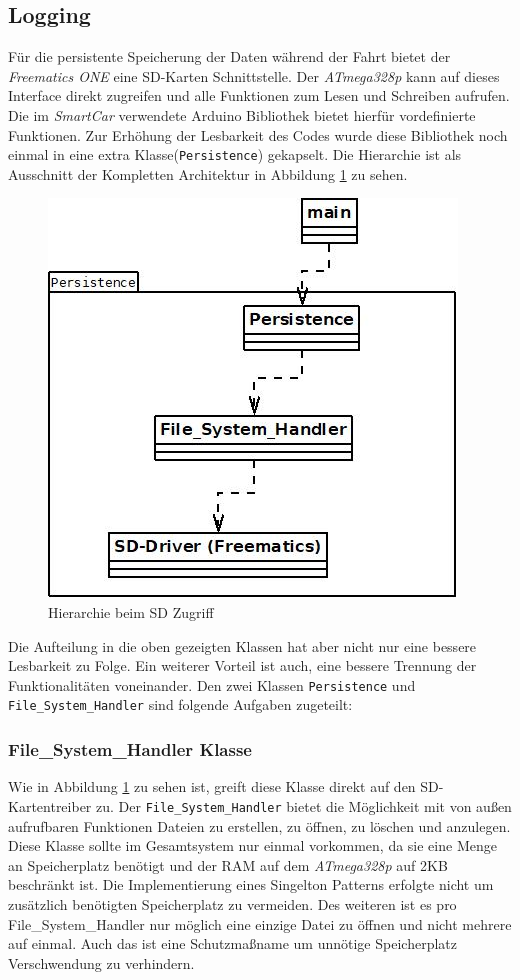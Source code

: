 \subsection{Logging}
\label{sec:Logging}
Für die persistente Speicherung der Daten während der Fahrt bietet der \textit{Freematics ONE} eine SD-Karten Schnittstelle. Der \textit{ATmega328p} kann auf dieses Interface direkt zugreifen und alle Funktionen zum Lesen und Schreiben aufrufen. Die im \textit{SmartCar} verwendete Arduino Bibliothek bietet hierfür vordefinierte Funktionen. Zur Erhöhung der Lesbarkeit des Codes wurde diese Bibliothek noch einmal in eine extra Klasse(\texttt{Persistence}) gekapselt. Die Hierarchie ist als Ausschnitt der Kompletten Architektur in Abbildung \ref{fig:Persistence} zu sehen. 
\begin{figure}[h]
  \begin{center}
    \includegraphics[scale=0.75]{./img/Persistence.jpg}
    \caption{Hierarchie beim SD Zugriff}
    \label{fig:Persistence}
  \end{center}
\end{figure}
Die Aufteilung in die oben gezeigten Klassen hat aber nicht nur eine bessere Lesbarkeit zu Folge. Ein weiterer Vorteil ist auch, eine bessere Trennung der Funktionalitäten voneinander. Den zwei Klassen \texttt{Persistence} und \texttt{File\_System\_Handler} sind folgende Aufgaben zugeteilt:\pagebreak
\subsubsection*{File\_System\_Handler Klasse}
Wie in Abbildung \ref{fig:Persistence} zu sehen ist, greift diese Klasse direkt auf den SD-Kartentreiber zu. Der \texttt{File\_System\_Handler} bietet die Möglichkeit mit von außen aufrufbaren Funktionen Dateien zu erstellen, zu öffnen, zu löschen und anzulegen. Diese Klasse sollte im Gesamtsystem nur einmal vorkommen, da sie eine Menge an Speicherplatz benötigt und der RAM auf dem \textit{ATmega328p} auf 2KB beschränkt ist.\cite{Atmega328P} Die Implementierung eines Singelton Patterns erfolgte nicht um zusätzlich benötigten Speicherplatz zu vermeiden.
Des weiteren ist es pro File\_System\_Handler nur möglich eine einzige Datei zu öffnen und nicht mehrere auf einmal. Auch das ist eine Schutzmaßname um unnötige Speicherplatz Verschwendung zu verhindern.
